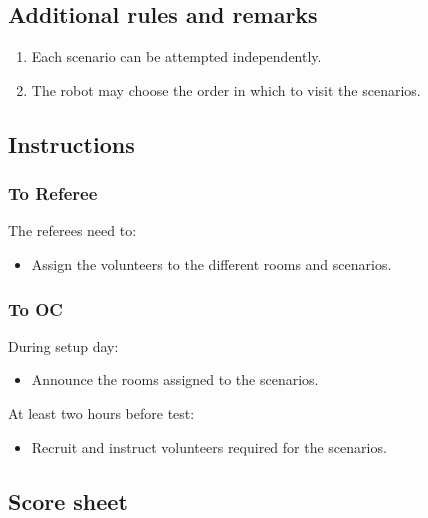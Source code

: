 


\subsection*{Additional rules and remarks}
\begin{enumerate}[nosep]
	\item Each scenario can be attempted independently.
	\item The robot may choose the order in which to visit the scenarios.
\end{enumerate}

\subsection*{Instructions}

\subsubsection*{To Referee}

The referees need to:
\begin{itemize}
	\item Assign the volunteers to the different rooms and scenarios.
\end{itemize}

\subsubsection*{To OC}

During setup day:
\begin{itemize}
	\item Announce the rooms assigned to the scenarios.
\end{itemize}

At least two hours before test:
\begin{itemize}
	\item Recruit and instruct volunteers required for the scenarios.
\end{itemize}

\subsection*{Score sheet}
